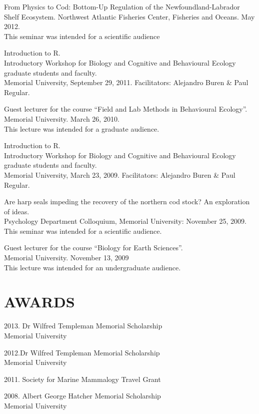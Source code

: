 \documentclass{res}
\begin{document}
\begin{resume}
From Physics to Cod: Bottom-Up Regulation of the Newfoundland-Labrador Shelf Ecosystem. Northwest Atlantic Fisheries Center, Fisheries and Oceans. May 2012. \\
This seminar was intended for a scientific audience 

Introduction to R.\\ Introductory Workshop for Biology and Cognitive and Behavioural Ecology graduate students and faculty.\\ Memorial University, September 29, 2011. Facilitators: Alejandro Buren \& Paul Regular.

Guest lecturer for the course “Field and Lab Methods in Behavioural Ecology”.\\ Memorial University. March 26, 2010. \\
This lecture was intended for a graduate audience.

Introduction to R.\\ Introductory Workshop for Biology and Cognitive and Behavioural Ecology graduate students and faculty. \\Memorial University, March 23, 2009. Facilitators: Alejandro Buren \& Paul Regular.


Are harp seals impeding the recovery of the northern cod stock? An exploration of ideas.\\
Psychology Department Colloquium, Memorial University: November 25, 2009. \\
This seminar was intended for a scientific audience.

Guest lecturer for the course “Biology for Earth Sciences”. \\Memorial University. November 13, 2009 \\
This lecture was intended for an undergraduate audience.
	
\pagebreak
\section{AWARDS}
\vspace{0.1in} 
\begin{hangparas}{.4in}{1}
2013. Dr Wilfred Templeman Memorial Scholarship\\
Memorial University

2012.Dr Wilfred Templeman Memorial Scholarship\\
Memorial University

2011. Society for Marine Mammalogy Travel Grant

2008. Albert George Hatcher Memorial Scholarship\\
Memorial University


\end{hangparas}
\end{resume}
\end{document}
